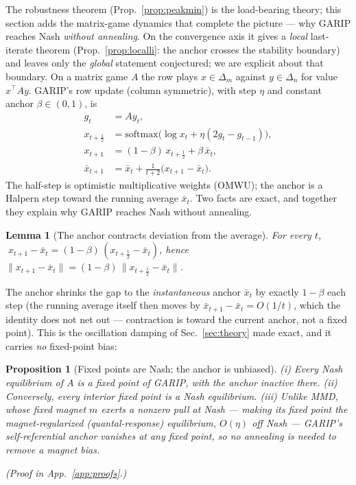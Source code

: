 \documentclass[10pt,twocolumn]{article}
\theoremstyle{plain}
\newtheorem{lemma}{Lemma}
\newtheorem{proposition}{Proposition}
\theoremstyle{remark}
\newcommand{\softmax}{\mathrm{softmax}}
\begin{document}
The robustness theorem (Prop.~\ref{prop:peakmin}) is the load-bearing theory; this
section adds the matrix-game dynamics that complete the picture --- why GARIP
reaches Nash \emph{without annealing}. On the convergence axis it gives a
\emph{local} last-iterate theorem (Prop.~\ref{prop:localli}: the anchor crosses the
stability boundary) and leaves only the \emph{global} statement conjectured; we are
explicit about that boundary.
On a matrix game $A$ the row plays $x\in\Delta_m$ against $y\in\Delta_n$ for value
$x^\top\! A y$. GARIP's row update (column symmetric), with step $\eta$ and constant
anchor $\beta\in(0,1)$, is
\begin{align*}
g_t &= A y_t,\\
x_{t+\frac12} &= \softmax\!\big(\log x_t + \eta(2g_t - g_{t-1})\big),\\
x_{t+1} &= (1-\beta)\,x_{t+\frac12} + \beta\,\bar x_t,\\
\bar x_{t+1} &= \bar x_t + \tfrac{1}{t+2}\big(x_{t+1}-\bar x_t\big).
\end{align*}
The half-step is optimistic multiplicative weights (OMWU); the anchor is a Halpern
step toward the running average $\bar x_t$. Two facts are exact, and together they
explain why GARIP reaches Nash without annealing.

\begin{lemma}[The anchor contracts deviation from the average]
\label{lem:contract}
For every $t$, $\;x_{t+1}-\bar x_t=(1-\beta)\,(x_{t+\frac12}-\bar x_t)$, hence
$\lVert x_{t+1}-\bar x_t\rVert = (1-\beta)\,\lVert x_{t+\frac12}-\bar x_t\rVert$.
\end{lemma}
\noindent The anchor shrinks the gap to the \emph{instantaneous} anchor $\bar x_t$
by exactly $1-\beta$ each step (the running average itself then moves by
$\bar x_{t+1}-\bar x_t=O(1/t)$, which the identity does not net out --- contraction
is toward the current anchor, not a fixed point). This is the oscillation damping of
Sec.~\ref{sec:theory} made exact, and it carries \emph{no} fixed-point bias:

\begin{proposition}[Fixed points are Nash; the anchor is unbiased]
\label{prop:fp}
(i) Every Nash equilibrium of $A$ is a fixed point of GARIP, with the anchor
inactive there. (ii) Conversely, every \emph{interior} fixed point is a Nash
equilibrium. (iii) Unlike MMD, whose \emph{fixed} magnet $m$ exerts a nonzero pull
at Nash --- making its fixed point the magnet-regularized (quantal-response)
equilibrium, $O(\eta)$ off Nash --- GARIP's self-referential anchor vanishes at any
fixed point, so no annealing is needed to remove a magnet bias.
\end{proposition}
\noindent\emph{(Proof in App.~\ref{app:proofs}.)}
\end{document}
